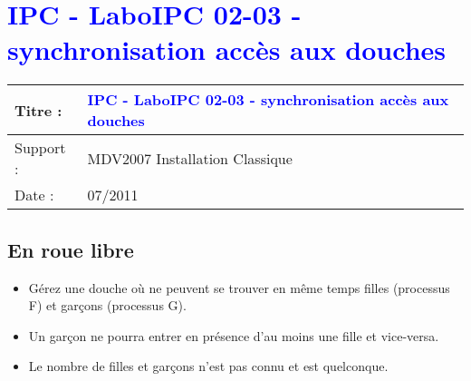 \lstset{language=c}
\renewcommand{\titre}{\textcolor{blue}{ IPC - LaboIPC 02-03 - synchronisation accès aux douches }}

\lhead{ \titre }
\section{{\titre} }

\begin{tabular}{|l|l|}
\hline
Titre : 	& \titre \\\hline
Support : 	& MDV2007 Installation Classique \\\hline
Date :		& 07/2011 \\\hline
\end{tabular}

\subsection{En roue libre}
\begin{itemize}
\item Gérez une douche où ne peuvent se trouver en même temps filles (processus F) et garçons (processus G). 
\item Un garçon ne pourra entrer en présence d'au moins une fille et vice-versa.
\item Le nombre de filles et garçons n'est pas connu et est quelconque.
\end{itemize}
\newpage
